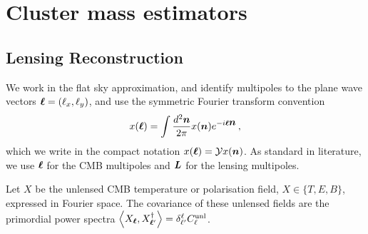 \documentclass[prd, superscriptaddress, tightenlines, longbibliography, nofootinbib, eqsecnum, amsfonts, amsmath, floatfix, twocolumn, notitlepage]{revtex4-2}
\newcommand{\LL}[1]{{\color{orange}{LL: #1}}}
\begin{document}
\section{Cluster mass estimators}
\label{sec:method}

\subsection{Lensing Reconstruction}

\LL{TODO: homogenize notations with the previous section}

We work in the flat sky approximation, and identify multipoles to the plane wave vectors ${\boldsymbol{\ell}} = (\ell_x, \ell_y)$, and use the symmetric Fourier transform convention
\begin{equation}
    x({\boldsymbol{\ell}}) = \int \frac{d^2 {\mbox{\boldmath{$n$}}}}{2\pi} x({\mbox{\boldmath{$n$}}}) e^{-i{\boldsymbol{\ell}} {\mbox{\boldmath{$n$}}}}\, ,
\end{equation}
which we write in the compact notation $x({\boldsymbol{\ell}}) = \mathcal{Y} x({\mbox{\boldmath{$n$}}})$.
As standard in literature, we use ${\boldsymbol{\ell}}$ for the CMB multipoles and ${\mbox{\boldmath{$L$}}}$ for the lensing multipoles.   

Let $X$ be the unlensed CMB temperature or polarisation field, $X \in \{T, E, B\}$, expressed in Fourier space. 
The covariance of these unlensed fields are the primordial power spectra 
$\left<X_{{\boldsymbol{\ell}}}, X_{{\boldsymbol{\ell}}'}^\dagger \right> = \delta^{\ell}_{\ell'} C_\ell^{\rm unl}$.
\end{document}
